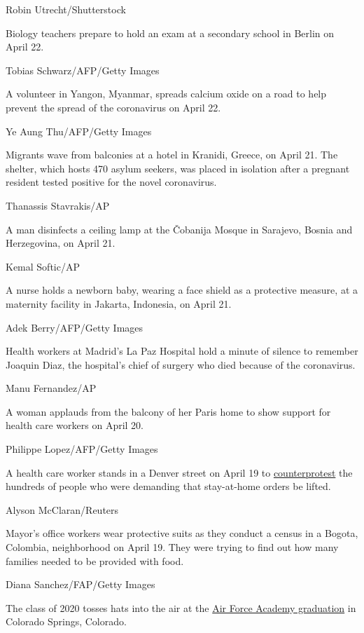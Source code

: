 Robin Utrecht/Shutterstock

Biology teachers prepare to hold an exam at a secondary school in Berlin
on April 22.

Tobias Schwarz/AFP/Getty Images

A volunteer in Yangon, Myanmar, spreads calcium oxide on a road to help
prevent the spread of the coronavirus on April 22.

Ye Aung Thu/AFP/Getty Images

Migrants wave from balconies at a hotel in Kranidi, Greece, on April 21.
The shelter, which hosts 470 asylum seekers, was placed in isolation
after a pregnant resident tested positive for the novel coronavirus.

Thanassis Stavrakis/AP

A man disinfects a ceiling lamp at the Čobanija Mosque in Sarajevo,
Bosnia and Herzegovina, on April 21.

Kemal Softic/AP

A nurse holds a newborn baby, wearing a face shield as a protective
measure, at a maternity facility in Jakarta, Indonesia, on April 21.

Adek Berry/AFP/Getty Images

Health workers at Madrid's La Paz Hospital hold a minute of silence to
remember Joaquin Diaz, the hospital's chief of surgery who died because
of the coronavirus.

Manu Fernandez/AP

A woman applauds from the balcony of her Paris home to show support for
health care workers on April 20.

Philippe Lopez/AFP/Getty Images

A health care worker stands in a Denver street on April 19 to
\href{https://www.cnn.com/2020/04/20/us/coronavirus-colorado-health-care-trnd/index.html}{counterprotest}
the hundreds of people who were demanding that stay-at-home orders be
lifted.

Alyson McClaran/Reuters

Mayor's office workers wear protective suits as they conduct a census in
a Bogota, Colombia, neighborhood on April 19. They were trying to find
out how many families needed to be provided with food.

Diana Sanchez/FAP/Getty Images

The class of 2020 tosses hats into the air at the
\href{https://www.cnn.com/2020/04/18/politics/mike-pence-air-force-academy-commencement-speech/index.html}{Air
Force Academy graduation} in Colorado Springs, Colorado.

